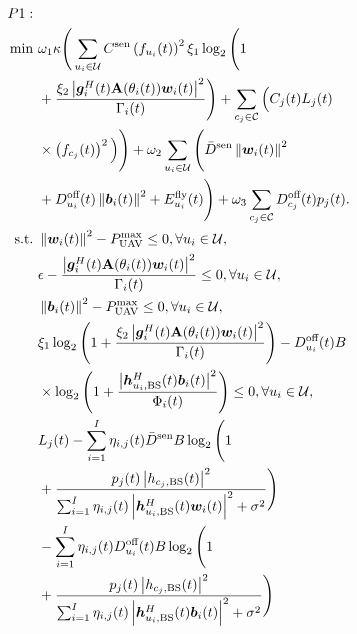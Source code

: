 \documentclass[10pt,journal,compsoc]{IEEEtran}
\begin{document}
\begin{align}
P1:\,\, & \notag\\
    \min \,\, &\omega_{1} \kappa \Bigg( \sum_{u_{i} \in \mathcal{U}}C^{\text{sen}}\left(f_{u_{i}}(t)\right)^{2} \xi_{1} \log_2 \Bigg(1 \notag \\
    & + \frac{\xi_{2} \left|\bm{g}^{H}_{i}(t)\mathbf{A}(\theta_{i}(t)) \bm{w}_{i}(t)\right|^{2}}{\Gamma_{i}(t)}\Bigg) + \sum_{c_{j} \in \mathcal{C}}\Big(C_{{j}}(t)L_{j}(t) \notag\\
    & \times \left(f_{c_{j}}(t)\right)^{2}\Big) \Bigg) + \omega_{2}\sum_{u_{i} \in \mathcal{U}} \Bigg(\bar{D}^{\text{sen}}\left\|\bm{w}_{i}(t)\right\|^{2}   \notag \\
    & + D_{u_{i}}^{\text{off}}(t)\left\|\bm{b}_{i}(t)\right\|^{2} + E_{u_{i}}^{\text{fly}}(t) \Bigg) + \omega_{3} \sum_{c_{j} \in \mathcal{C}} D_{c_{j}}^{\text{off}}(t)p_{j}(t). \notag\\
    \text{s.t.}\,\, 
    & \left\|\bm{w}_{i}(t)\right\|^{2} - P^{\max}_{\text{UAV}} \le 0, \forall u_{i} \in \mathcal{U},  \label{P1:UAV-Sen-Max-Power} \\
    & \epsilon - \frac{\left|\bm{g}^{H}_{i}(t)\mathbf{A}(\theta_{i}(t)) \bm{w}_{i}(t)\right|^{2}}{\Gamma_{i}(t)} \le 0, \forall u_{i} \in \mathcal{U}, \label{P1:Sensing-SINR} \\
    & \left\|\bm{b}_{i}(t)\right\|^{2} -  P^{\max}_{\text{UAV}} \le 0,  \forall u_{i} \in \mathcal{U},  \label{P1:UAV-Off-Max-Power} \\
    & \xi_{1} \log_2 \Bigg(1 +  \frac{\xi_{2} \left|\bm{g}^{H}_{i}(t)\mathbf{A}(\theta_{i}(t)) \bm{w}_{i}(t)\right|^{2}}{\Gamma_{i}(t)}\Bigg) - D_{u_{i}}^{\text{off}}(t)B \notag \\
    & \times \log_2 \left( 1 + \frac{\left|\bm{h}^{H}_{u_{i}, \text{BS}}(t)\bm{b}_{i}(t)\right|^{2}}{\Phi_i(t)} \right)\le 0, \forall u_{i} \in \mathcal{U}, \label{P1:UAVs-task-successful-offloading} \\
    & L_{j}(t) - \sum_{i = 1}^{I} \eta_{i, j}(t)\bar{D}^{\text{sen}} B \log_2 \Bigg( 1 \notag \\
    & + \frac{p_{j}(t) \left|h_{c_{j}, \text{BS}}(t)\right|^{2}}{\sum_{i = 1}^{I} \eta_{i, j}(t) \left|\bm{h}^{H}_{u_{i}, \text{BS}}(t) \bm{w}_{i}(t)\right|^{2} + \sigma^{2}} \Bigg)  \notag \\
    & - \sum_{i = 1}^{I} \eta_{i, j}(t) D_{u_{i}}^{\text{off}}(t) B \log_2 \Bigg( 1 \notag \\
    & + \frac{p_{j}(t) \left|h_{c_{j}, \text{BS}}(t)\right|^{2}}{\sum_{i = 1}^{I} \eta_{i, j}(t) \left|\bm{h}^{H}_{u_{i}, \text{BS}}(t) \bm{b}_{i}(t)\right|^{2} + \sigma^{2}} \Bigg) \notag \\

\end{align}
\end{document}
